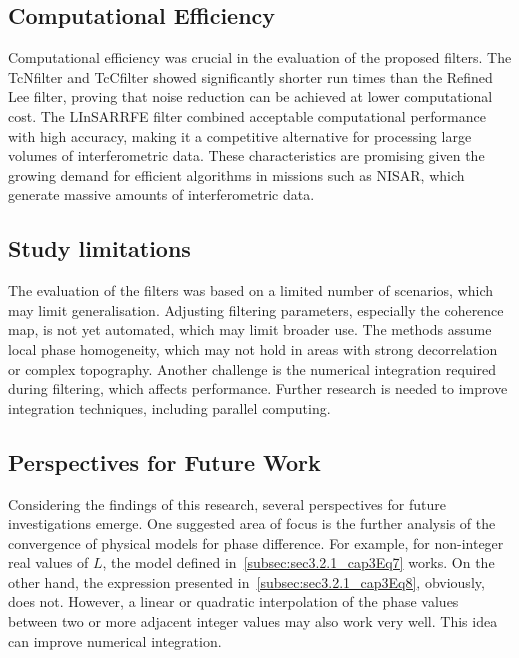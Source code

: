 \documentclass[remotesensing,article,submit,pdftex,moreauthors]{Definitions/mdpi}
\begin{document}
\subsection{Computational Efficiency}
Computational efficiency was crucial in the evaluation of the proposed filters.
The TcNfilter and TcCfilter showed significantly shorter run times than the Refined Lee filter, proving that noise reduction can be achieved at lower computational cost. 
The LInSARRFE filter combined acceptable computational performance with high accuracy, making it a competitive alternative for processing large volumes of interferometric data. 
These characteristics are promising given the growing demand for efficient algorithms in missions such as NISAR, which generate massive amounts of interferometric data.

\subsection{Study limitations}

The evaluation of the filters was based on a limited number of scenarios, which may limit generalisation. 
Adjusting filtering parameters, especially the coherence map, is not yet automated, which may limit broader use. 
The methods assume local phase homogeneity, which may not hold in areas with strong decorrelation or complex topography. 
Another challenge is the numerical integration required during filtering, which affects performance. Further research is needed to improve integration techniques, including parallel computing.

\subsection{Perspectives for Future Work}

Considering the findings of this research, several perspectives for future investigations emerge. One suggested area of focus is the further analysis of the convergence of physical models for phase difference. For example, for non-integer real values of $L$, the model defined in~\eqref{subsec:sec3.2.1_cap3Eq7} works. 
On the other hand, the expression presented in~\eqref{subsec:sec3.2.1_cap3Eq8}, obviously, does not. 
However, a linear or quadratic interpolation of the phase values between two or more adjacent integer values may also work very well. 
This idea can improve numerical integration.

\end{document}

